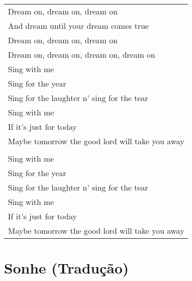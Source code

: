 \begin{longtable}{@{}l@{}}
Dream on, dream on, dream on                    \\
And dream until your dream comes true           \\
Dream on, dream on, dream on                    \\
Dream on, dream on, dream on, dream on          \\
Sing with me                                    \\
Sing for the year                               \\
Sing for the laughter n' sing for the tear      \\
Sing with me                                    \\
If it's just for today                          \\
Maybe tomorrow the good lord will take you away \\
                                                \\
Sing with me                                    \\
Sing for the year                               \\
Sing for the laughter n' sing for the tear      \\
Sing with me                                    \\
If it's just for today                          \\
Maybe tomorrow the good lord will take you away \\* \bottomrule
\end{longtable}

\section{Sonhe (Tradução)}

